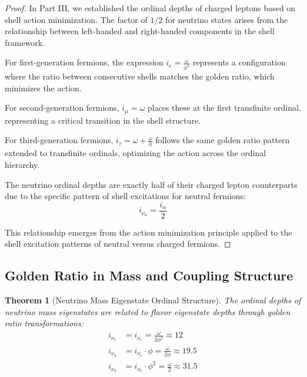 \documentclass[12pt,a4paper]{article}
\newtheorem{theorem}{Theorem}[section]
\begin{document}
\begin{proof}
In Part III, we established the ordinal depths of charged leptons based on shell action minimization. The factor of $1/2$ for neutrino states arises from the relationship between left-handed and right-handed components in the shell framework.

For first-generation fermions, the expression $i_e = \frac{\omega}{\phi^2}$ represents a configuration where the ratio between consecutive shells matches the golden ratio, which minimizes the action.

For second-generation fermions, $i_{\mu} = \omega$ places these at the first transfinite ordinal, representing a critical transition in the shell structure.

For third-generation fermions, $i_{\tau} = \omega + \frac{\omega}{\phi}$ follows the same golden ratio pattern extended to transfinite ordinals, optimizing the action across the ordinal hierarchy.

The neutrino ordinal depths are exactly half of their charged lepton counterparts due to the specific pattern of shell excitations for neutral fermions:
\begin{equation}
i_{\nu_\alpha} = \frac{i_\alpha}{2}
\end{equation}

This relationship emerges from the action minimization principle applied to the shell excitation patterns of neutral versus charged fermions.
\end{proof}

\subsection{Golden Ratio in Mass and Coupling Structure}
\label{subsec:mass-coupling}

\begin{theorem}[Neutrino Mass Eigenstate Ordinal Structure]
\label{thm:mass-eigenstate-structure}
The ordinal depths of neutrino mass eigenstates are related to flavor eigenstate depths through golden ratio transformations:
\begin{align}
i_{\nu_1} &= i_{\nu_e} = \frac{\omega}{2\phi^2} \approx 12 \\
i_{\nu_2} &= i_{\nu_e} \cdot \phi = \frac{\omega}{2\phi} \approx 19.5 \\
i_{\nu_3} &= i_{\nu_e} \cdot \phi^2 = \frac{\omega}{2} \approx 31.5
\end{align}
\end{theorem}
\end{document}
